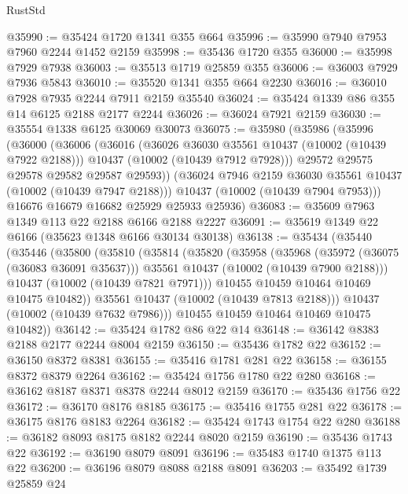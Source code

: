 \begin{lexlean}{RustStd}
\begin{coremodule}
@35990 := @35424 @1720 @1341 @355 @664
@35996 := @35990 @7940 @7953 @7960 @2244 @1452 @2159
@35998 := @35436 @1720 @355
@36000 := @35998 @7929 @7938
@36003 := @35513 @1719 @25859 @355
@36006 := @36003 @7929 @7936 @5843
@36010 := @35520 @1341 @355 @664 @2230
@36016 := @36010 @7928 @7935 @2244 @7911 @2159 @35540
@36024 := @35424 @1339 @86 @355 @14 @6125 @2188 @2177 @2244
@36026 := @36024 @7921 @2159
@36030 := @35554 @1338 @6125 @30069 @30073
@36075 := @35980
    (@35986
      (@35996
        (@36000
          (@36006
            (@36016
              (@36026 @36030 @35561 @10437 (@10002 (@10439 @7922 @2188)))
              @10437
              (@10002 (@10439 @7912 @7928)))
            @29572
            @29575
            @29578
            @29582
            @29587
            @29593))
        (@36024 @7946 @2159 @36030 @35561 @10437 (@10002 (@10439 @7947 @2188)))
        @10437
        (@10002 (@10439 @7904 @7953)))
      @16676
      @16679
      @16682
      @25929
      @25933
      @25936)
@36083 := @35609 @7963 @1349 @113 @22 @2188 @6166 @2188 @2227
@36091 := @35619 @1349 @22 @6166 (@35623 @1348 @6166 @30134 @30138)
@36138 := @35434
    (@35440
      (@35446
        (@35800
          (@35810
            (@35814
              (@35820
                (@35958
                  (@35968
                    (@35972 (@36075 (@36083 @36091 @35637)))
                    @35561
                    @10437
                    (@10002 (@10439 @7900 @2188)))
                  @10437
                  (@10002 (@10439 @7821 @7971)))
                @10455
                @10459
                @10464
                @10469
                @10475
                @10482))
            @35561
            @10437
            (@10002 (@10439 @7813 @2188)))
          @10437
          (@10002 (@10439 @7632 @7986)))
        @10455
        @10459
        @10464
        @10469
        @10475
        @10482))
@36142 := @35424 @1782 @86 @22 @14
@36148 := @36142 @8383 @2188 @2177 @2244 @8004 @2159
@36150 := @35436 @1782 @22
@36152 := @36150 @8372 @8381
@36155 := @35416 @1781 @281 @22
@36158 := @36155 @8372 @8379 @2264
@36162 := @35424 @1756 @1780 @22 @280
@36168 := @36162 @8187 @8371 @8378 @2244 @8012 @2159
@36170 := @35436 @1756 @22
@36172 := @36170 @8176 @8185
@36175 := @35416 @1755 @281 @22
@36178 := @36175 @8176 @8183 @2264
@36182 := @35424 @1743 @1754 @22 @280
@36188 := @36182 @8093 @8175 @8182 @2244 @8020 @2159
@36190 := @35436 @1743 @22
@36192 := @36190 @8079 @8091
@36196 := @35483 @1740 @1375 @113 @22
@36200 := @36196 @8079 @8088 @2188 @8091
@36203 := @35492 @1739 @25859 @24

\end{coremodule}
\end{lexlean}
